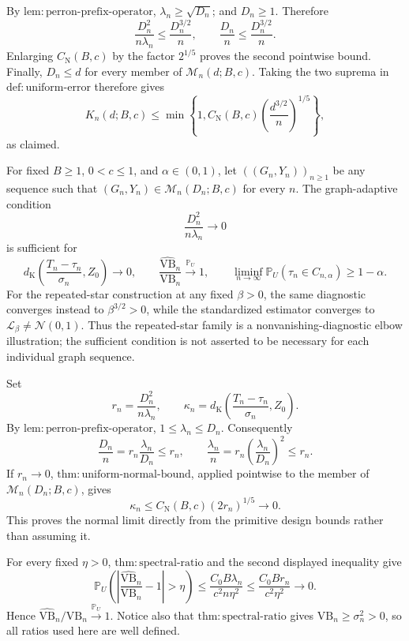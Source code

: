 By \(\mathrm{lem:perron\text{-}prefix\text{-}operator}\), \(\lambda_n\ge\sqrt{D_n}\); and \(D_n\ge1\).  Therefore
\[
 \frac{D_n^2}{n\lambda_n}\le\frac{D_n^{3/2}}n,
 \qquad
 \frac{D_n}{n}\le\frac{D_n^{3/2}}n.
\]
Enlarging \(C_{\mathrm N}(B,c)\) by the factor \(2^{1/5}\) proves the second pointwise bound.  Finally, \(D_n\le d\) for every member of \(\mathcal M_n(d;B,c)\).  Taking the two suprema in \(\mathrm{def:uniform\text{-}error}\) therefore gives
\[
 K_n(d;B,c)\le\min\left\{1,C_{\mathrm N}(B,c)
 \left(\frac{d^{3/2}}n\right)^{1/5}\right\},
\]
as claimed.

For fixed \(B\ge1\), \(0<c\le1\), and \(\alpha\in(0,1)\), let \(((G_n,Y_n))_{n\ge1}\) be any sequence such that \((G_n,Y_n)\in\mathcal M_n(D_n;B,c)\) for every \(n\).  The graph-adaptive condition
\[
 \frac{D_n^2}{n\lambda_n}\longrightarrow0
\]
is sufficient for
\[
 d_{\mathrm K}\left(\frac{T_n-\tau_n}{\sigma_n},Z_0\right)\longrightarrow0,
 \qquad
 \frac{\widehat{\mathrm{VB}}_n}{\mathrm{VB}_n}
 \xrightarrow{\mathbb P_U}1,
 \qquad
 \liminf_{n\to\infty}\mathbb P_U(\tau_n\in C_{n,\alpha})\ge1-\alpha.
\]
For the repeated-star construction at any fixed \(\beta>0\), the same diagnostic converges instead to \(\beta^{3/2}>0\), while the standardized estimator converges to \(\mathcal L_{\beta}\ne\mathcal N(0,1)\).  Thus the repeated-star family is a nonvanishing-diagnostic elbow illustration; the sufficient condition is not asserted to be necessary for each individual graph sequence.

Set
\[
 r_n=\frac{D_n^2}{n\lambda_n},
 \qquad
 \kappa_n=d_{\mathrm K}\left(\frac{T_n-\tau_n}{\sigma_n},Z_0\right).
\]
By \(\mathrm{lem:perron\text{-}prefix\text{-}operator}\), \(1\le\lambda_n\le D_n\).  Consequently
\[
 \frac{D_n}{n}=r_n\frac{\lambda_n}{D_n}\le r_n,
 \qquad
 \frac{\lambda_n}{n}=r_n\left(\frac{\lambda_n}{D_n}\right)^2\le r_n.
\]
If \(r_n\to0\), \(\mathrm{thm:uniform\text{-}normal\text{-}bound}\), applied pointwise to the member of \(\mathcal M_n(D_n;B,c)\), gives
\[
 \kappa_n\le C_{\mathrm N}(B,c)(2r_n)^{1/5}\longrightarrow0.
\]
This proves the normal limit directly from the primitive design bounds rather than assuming it.

For every fixed \(\eta>0\), \(\mathrm{thm:spectral\text{-}ratio}\) and the second displayed inequality give
\[
 \mathbb P_U\left(
 \left|\frac{\widehat{\mathrm{VB}}_n}{\mathrm{VB}_n}-1\right|>\eta
 \right)
 \le\frac{C_0B\lambda_n}{c^2n\eta^2}
 \le\frac{C_0B r_n}{c^2\eta^2}\longrightarrow0.
\]
Hence \(\widehat{\mathrm{VB}}_n/\mathrm{VB}_n\xrightarrow{\mathbb P_U}1\).  Notice also that \(\mathrm{thm:spectral\text{-}ratio}\) gives \(\mathrm{VB}_n\ge\sigma_n^2>0\), so all ratios used here are well defined.

